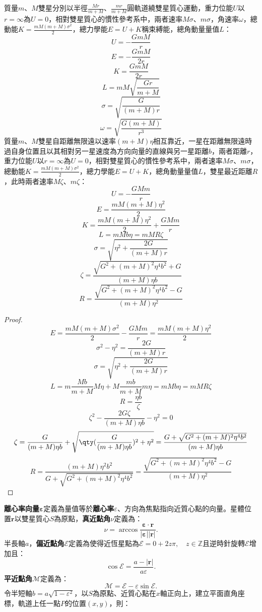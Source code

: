 \documentclass[a4paper,12pt]{article}
\begin{document}
質量$m$、$M$雙星分別以半徑$\frac{Mr}{m+M}$、$\frac{mr}{m+M}$圓軌道繞雙星質心運動，重力位能$U$以$r=\infty$為$U=0$，相對雙星質心的慣性參考系中，兩者速率$M\sigma$、$m\sigma$，角速率$\omega$，總動能$K=\frac{mM(m+M)\sigma^2}{2}$，總力學能$E=U+K$稱束縛能，總角動量量值$L$：
\[U=-\frac{GmM}{r}\]
\[E=-\frac{GmM}{2r}\]
\[K=\frac{GmM}{2r}\]
\[L=mM\sqrt{\frac{Gr}{m+M}}\]
\[\sigma=\sqrt{\frac{G}{(m+M)r}}\]
\[\omega=\sqrt{\frac{G(m+M)}{r^3}}\]
質量$m$、$M$雙星自距離無限遠以速率$(m+M)\eta$相互靠近，一星在距離無限遠時過自身位置且以其相對另一星速度為方向向量的直線與另一星距離$b$，兩者距離$r$，重力位能$U$以$r=\infty$為$U=0$，相對雙星質心的慣性參考系中，兩者速率$M\sigma$、$m\sigma$，總動能$K=\frac{mM(m+M)\sigma^2}{2}$，總力學能$E=U+K$，總角動量量值$L$，雙星最近距離$R$，此時兩者速率$M\zeta$、$m\zeta$：
\[U=-\frac{GMm}{r}\]
\[E=\frac{mM(m+M)\eta^2}{2}\]
\[K=\frac{mM(m+M)\eta^2}{2}+\frac{GMm}{r}\]
\[L=mMb\eta=mMR\zeta\]
\[\sigma=\sqrt{\eta^2+\frac{2G}{(m+M)r}}\]
\[\zeta=\frac{\sqrt{G^2+(m+M)^2\eta^4b^2}+G}{(m+M)\eta b}\]
\[R=\frac{\sqrt{G^2+(m+M)^2\eta^4b^2}-G}{(m+M)\eta^2}\]
\begin{proof}
\[E=\frac{mM(m+M)\sigma^2}{2}-\frac{GMm}{r}=\frac{mM(m+M)\eta^2}{2}\]
\[\sigma^2-\eta^2=\frac{2G}{(m+M)r}\]
\[\sigma=\sqrt{\eta^2+\frac{2G}{(m+M)r}}\]
\[L=m\frac{Mb}{m+M}M\eta+M\frac{mb}{m+M}m\eta=mMb\eta=mMR\zeta\]
\[R=\frac{\eta b}{\zeta}\]
\[\zeta^2-\frac{2G\zeta}{(m+M)\eta b}-\eta^2=0\]
\[\zeta=\frac{G}{(m+M)\eta b}+\sqrt{\qty(\frac{G}{(m+M)\eta b})^2+\eta^2}=\frac{G+\sqrt{G^2+(m+M)^2\eta^4b^2}}{(m+M)\eta b}\]
\[R=\frac{(m+M)\eta^2b^2}{G+\sqrt{G^2+(m+M)^2\eta^4b^2}}=\frac{\sqrt{G^2+(m+M)^2\eta^4b^2}-G}{(m+M)\eta^2}\]
\end{proof}
\textbf{離心率向量}$\boldsymbol{\varepsilon}$定義為量值等於\textbf{離心率}$\varepsilon$、方向為焦點指向近質心點的向量。星體位置$\mathbf{r}$以雙星質心$S$為原點，\textbf{真近點角}$\nu$定義為：
\[\nu=\arccos\frac{\boldsymbol{\varepsilon}\cdot\mathbf{r}}{|\boldsymbol{\varepsilon}||\mathbf{r}|}.\]
半長軸$a$，\textbf{偏近點角}$\mathscr{E}$定義為使得近恆星點為$\mathscr{E}=0+2z\pi,\quad z\in\mathbb{Z}$且逆時針旋轉$\mathscr{E}$增加且：
\[\cos\mathscr{E}=\frac{a-|\mathbf{r}|}{a\varepsilon}.\]
\textbf{平近點角}$\mathscr{M}$定義為：
\[\mathscr{M}=\mathscr{E}-\varepsilon\sin\mathscr{E}.\]
令半短軸$b=a\sqrt{1-\varepsilon^2}$，以$S$為原點、近質心點在$x$軸正向上，建立平面直角座標，軌道上任一點$P$的位置$(x,y)$，則：
\end{document}
